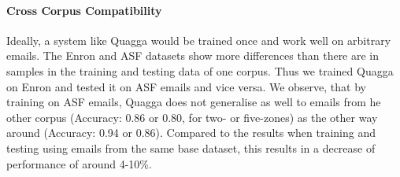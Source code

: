 \documentclass{llncs}
\begin{document}


\paragraph{Cross Corpus Compatibility}
Ideally, a system like Quagga would be trained once and work well on arbitrary emails.
The Enron and ASF datasets show more differences than there are in samples in the training and testing data of one corpus.
Thus we trained Quagga on Enron and tested it on ASF emails and vice versa.
We observe, that by training on ASF emails, Quagga does not generalise as well to emails from he other corpus (Accuracy: 0.86 or 0.80, for two- or five-zones) as the other way around (Accuracy: 0.94 or 0.86).
Compared to the results when training and testing using emails from the same base dataset, this results in a decrease of performance of around 4-10\%.
\end{document}
